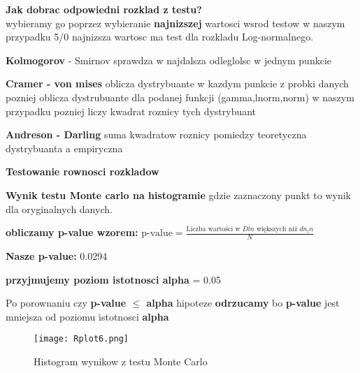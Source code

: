 \documentclass{article}
\begin{document}
\vspace{12pt}

\hrulefill

\textbf{Jak dobrac odpowiedni rozklad z testu?}\\wybieramy go poprzez wybieranie \textbf{najnizszej} wartosci wsrod testow
w naszym przypadku 5/0 najnizsza wartosc ma test dla rozkladu Log-normalnego.

\hrulefill

\vspace{12pt}

\textbf{Kolmogorov} - Smirnov sprawdza w najdalsza odleglolsc w jednym punkcie 

\vspace{12pt}

\textbf{Cramer - von mises} oblicza dystrybuante w kazdym punkcie z probki danych pozniej oblicza dystrubuante dla podanej funkcji (gamma,lnorm,norm) w naszym przypadku 
pozniej liczy kwadrat roznicy tych dystrybuant

\vspace{12pt}

\textbf{Andreson - Darling} suma kwadratow roznicy pomiedzy teoretyczna dystrybuanta a empiryczna 

\hrulefill

\textbf{Testowanie rownosci rozkladow}

\vspace{12pt}

\textbf{Wynik testu Monte carlo na histogramie} gdzie zaznaczony punkt to wynik dla oryginalnych danych.

\vspace{12pt}

\textbf{obliczamy p-value wzorem:} $\text{p-value} = \frac{\text{Liczba wartości w } Dln \text{ większych niż } dn_ln}{N}$

\vspace{12pt}

\textbf{Nasze p-value:} 0.0294

\vspace{12pt}

\textbf{przyjmujemy poziom istotnosci alpha }= 0.05

\vspace{12pt}

\text Po porownaniu czy \textbf{p-value $\leq$ alpha} hipoteze \textbf{odrzucamy} bo \textbf{p-value} jest mniejsza od poziomu istotnosci \textbf{alpha}

\begin{figure}[m]
    \centering
    \texttt{[image: Rplot6.png]}
    \caption{Histogram wynikow z testu Monte Carlo}
    \label{fig:enter-label}
\end{figure}
\end{document}
